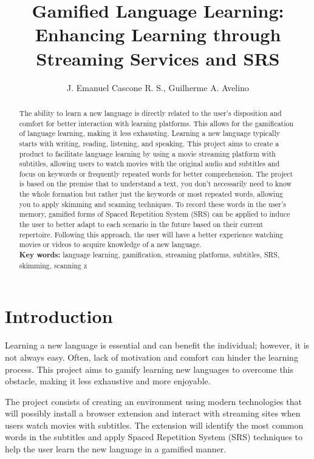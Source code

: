 \documentclass[12pt]{article}
\title{Gamified Language Learning: Enhancing Learning through Streaming Services and SRS}
\author{J. Emanuel Cascone R. S.\inst{1}, Guilherme A. Avelino\inst{1} }
\begin{document}
 

\maketitle

\begin{abstract}
  The ability to learn a new language is directly related to the user's disposition and comfort for better interaction with learning platforms. This allows for the gamification of language learning, making it less exhausting. Learning a new language typically starts with writing, reading, listening, and speaking. This project aims to create a product to facilitate language learning by using a movie streaming platform with subtitles, allowing users to watch movies with the original audio and subtitles and focus on keywords or frequently repeated words for better comprehension. The project is based on the premise that to understand a text, you don't necessarily need to know the whole formation but rather just the keywords or most repeated words, allowing you to apply skimming and scanning techniques. To record these words in the user's memory, gamified forms of Spaced Repetition System (SRS) can be applied to induce the user to better adapt to each scenario in the future based on their current repertoire. Following this approach, the user will have a better experience watching movies or videos to acquire knowledge of a new language. \\
  \textbf{Key words:} language learning, gamification, streaming platforms, subtitles, SRS, skimming, scanning
z
\end{abstract} 



\section{Introduction}


Learning a new language is essential and can benefit the individual; however, it is not always easy. Often, lack of motivation and comfort can hinder the learning process. This project aims to gamify learning new languages to overcome this obstacle, making it less exhaustive and more enjoyable.

The project consists of creating an environment using modern technologies that will possibly install a browser extension and interact with streaming sites when users watch movies with subtitles. The extension will identify the most common words in the subtitles and apply Spaced Repetition System (SRS) techniques to help the user learn the new language in a gamified manner.
\end{document}
